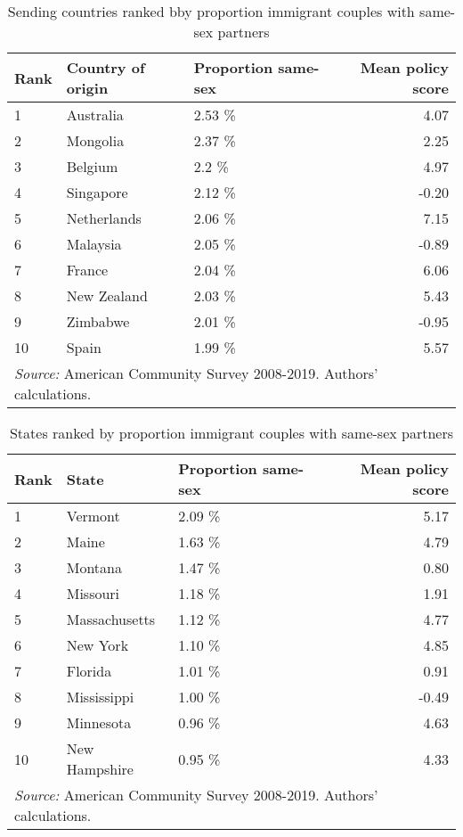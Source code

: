 \documentclass[
  11pt,
]{article}
\begin{document}
\begin{table}

\caption{\label{tab:country-tab}Sending countries ranked bby proportion immigrant couples with same-sex partners}
\centering
\begin{tabular}[t]{lllr}
\toprule
Rank & Country of origin & Proportion same-sex & Mean policy score\\
\midrule
1 & Australia & 2.53 \% & 4.07\\
2 & Mongolia & 2.37 \% & 2.25\\
3 & Belgium & 2.2 \% & 4.97\\
4 & Singapore & 2.12 \% & -0.20\\
5 & Netherlands & 2.06 \% & 7.15\\
6 & Malaysia & 2.05 \% & -0.89\\
7 & France & 2.04 \% & 6.06\\
8 & New Zealand & 2.03 \% & 5.43\\
9 & Zimbabwe & 2.01 \% & -0.95\\
10 & Spain & 1.99 \% & 5.57\\
\bottomrule
\multicolumn{4}{l}{\rule{0pt}{1em}\textit{Source:} American Community Survey 2008-2019. Authors' calculations.}\\
\end{tabular}
\end{table}

\begin{table}

\caption{\label{tab:state-tab}States ranked by proportion immigrant couples with same-sex partners}
\centering
\begin{tabular}[t]{lllr}
\toprule
Rank & State & Proportion same-sex & Mean policy score\\
\midrule
1 & Vermont & 2.09 \% & 5.17\\
2 & Maine & 1.63 \% & 4.79\\
3 & Montana & 1.47 \% & 0.80\\
4 & Missouri & 1.18 \% & 1.91\\
5 & Massachusetts & 1.12 \% & 4.77\\
6 & New York & 1.10 \% & 4.85\\
7 & Florida & 1.01 \% & 0.91\\
8 & Mississippi & 1.00 \% & -0.49\\
9 & Minnesota & 0.96 \% & 4.63\\
10 & New Hampshire & 0.95 \% & 4.33\\
\bottomrule
\multicolumn{4}{l}{\rule{0pt}{1em}\textit{Source:} American Community Survey 2008-2019. Authors' calculations.}\\
\end{tabular}
\end{table}
\end{document}
